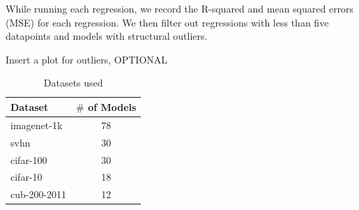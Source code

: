 While running each regression, we record the R-squared and mean squared errors (MSE) for each regression. We then filter out regressions with less than five datapoints and models with structural outliers.


Insert a plot for outliers, OPTIONAL


\begin{table}[t]
\small
\begin{center}
\begin{tabular}{|p{1in}|c|}
\hline
Dataset & $\#$ of Models \\
\hline
imagenet-1k   &  78 \\
svhn          &  30 \\
cifar-100     &  30 \\
cifar-10      &  18 \\
cub-200-2011  &  12 \\
\hline
\end{tabular}
\end{center}
\caption{Datasets used}
\label{table:datasets}
\end{table}




